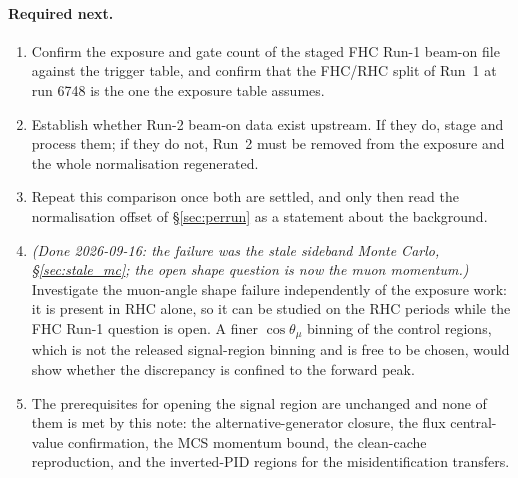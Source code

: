 \documentclass[11pt,a4paper]{article}
\begin{document}
\paragraph{Required next.}
\begin{enumerate}[itemsep=3pt]
  \item Confirm the exposure and gate count of the staged FHC Run-1 beam-on file against
    the trigger table, and confirm that the FHC/RHC split of Run~1 at run 6748 is the one
    the exposure table assumes.
  \item Establish whether Run-2 beam-on data exist upstream. If they do, stage and process
    them; if they do not, Run~2 must be removed from the exposure and the whole
    normalisation regenerated.
  \item Repeat this comparison once both are settled, and only then read the
    normalisation offset of \S\ref{sec:perrun} as a statement about the background.
  \item \emph{(Done 2026-09-16: the failure was the stale sideband Monte Carlo, \S\ref{sec:stale_mc}; the open
    shape question is now the muon momentum.)} Investigate the muon-angle shape failure independently of the exposure work: it is
    present in RHC alone, so it can be studied on the RHC periods while the FHC Run-1
    question is open. A finer $\cos\theta_\mu$ binning of the control regions, which is
    not the released signal-region binning and is free to be chosen, would show whether
    the discrepancy is confined to the forward peak.
  \item The prerequisites for opening the signal region are unchanged and none of them is
    met by this note: the alternative-generator closure, the flux central-value
    confirmation, the MCS momentum bound, the clean-cache reproduction, and the
    inverted-PID regions for the misidentification transfers.
\end{enumerate}
\end{document}
